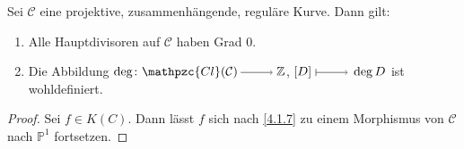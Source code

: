 \documentclass[a4paper,12pt]{scrbook}
\theoremstyle{keinenummern} %
\theoremstyle{mitnummern}
\theoremstyle{unserbeweis}
\newtheorem{proof}{Beweis}
\def\CC{\mathcal{C}}
\def\P{\mathbb{P}}
\newcommand{\Cl}{\mathpzc{Cl}}
\newcommand{\set}[1]{\ensuremath{\mathbb{#1}}}
\newcommand{\Z}{\set{Z}}
\newcommand{\ra}{\raisebox{-1pt}{\tikz{\draw[thin,shorten >=3pt, ->] (0,0) node{\hspace*{-2pt}} -- node{} (1,0);}}\penalty1000\relax}
\renewcommand{\mapsto}{\raisebox{-1pt}{\tikz{\draw[thin,shorten >=3pt, |->] (0,0) node{\hspace*{0pt}} -- node{} (1,0);}}\penalty1000\relax}
\begin{document}
\begin{kor}\label{4.2.4}
Sei $\CC$ eine projektive, zusammenhängende, reguläre Kurve. Dann gilt:
\begin{enumerate}
\item{} Alle Hauptdivisoren auf $\CC$ haben Grad $0$.
\item{} Die Abbildung $\deg\colon\Cl(\CC)\ra\Z$, $[D]\mapsto\deg D$ ist wohldefiniert.
\end{enumerate}\end{kor}

\begin{proof}
Sei $f\in K(C)$. Dann lässt $f$ sich nach \cref{4.1.7} zu einem Morphismus von $\CC$ nach $\P^{1}$ fortsetzen.
\end{proof}
\end{document}
